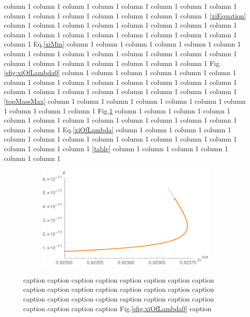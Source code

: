 \documentclass[a4paper,11pt]{article}
\makeatletter
\newcommand*{\fig}{Fig.\@\xspace}
\newcommand*{\Eq}{Eq.\@\xspace}
\makeatother
\begin{document}
  column 1  column 1  column 1  column 1  column 1  column 1  column 1  column 1  column 1  column 1  column 1  column 1  column 1  column 1  column 1 \eqref{xiEquation}  column 1  column 1  column 1   column 1  column 1  column 1  column 1  column 1  column 1  column 1  column 1  column 1  column 1  column 1  column 1   column 1  column 1 \Eq \eqref{xiMin}  column 1  column 1  column 1  column 1  column 1  column 1  column 1  column 1  column 1  column 1  column 1  column 1  column 1  column 1  column 1  column 1  column 1  column 1  column 1  column 1  column 1  \fig \ref{sfig:xiOfLambda0}  column 1  column 1  column 1  column 1  column 1  column 1  column 1  column 1  column 1  column 1  column 1  column 1  column 1  column 1   column 1  column 1  column 1  column 1  column 1  column 1  column 1  column 1 \eqref{topMassMax}  column 1  column 1  column 1  column 1     column 1  column 1  column 1  column 1  column 1  column 1 \fig \ref{sfig:epsilonOfLambda0}  column 1  column 1  column 1  column 1   column 1  column 1  column 1  column 1   column 1  column 1  column 1  column 1  column 1  column 1 \Eq \eqref{xiOfLambda}  column 1  column 1  column 1  column 1   column 1  column 1    column 1  column 1  column 1   column 1  column 1  column 1   column 1  column 1  column 1 \ref{table}  column 1  column 1  column 1  column 1  column 1  column 1   \begin{figure}
	\centering 
	\begin{subfigure}{0.6\textwidth}
		\includegraphics[width=\textwidth]{epsilonOfYt0.pdf}
	\end{subfigure}
		\caption{  caption  caption  caption   caption  caption  caption  caption  caption  caption  caption  caption   caption  caption  caption  caption  caption  caption  caption  caption  caption  caption  caption  caption  caption  caption  caption  caption  caption \fig \ref{sfig:xiOfLambda0}  caption }
				\label{sfig:epsilonOfLambda0}
\end{figure}



\end{document}
